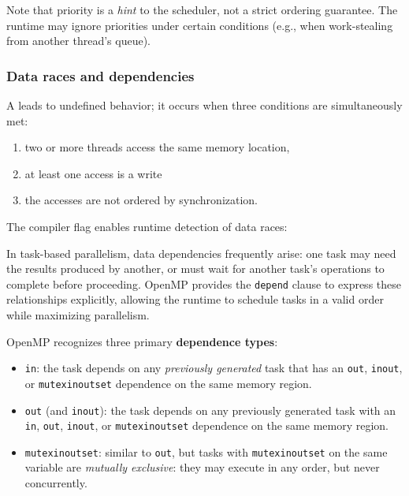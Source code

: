 Note that priority is a \emph{hint} to the scheduler, not a strict ordering guarantee. The runtime may ignore priorities under certain conditions (e.g., when work-stealing from another thread's queue).

\subsubsection{Data races and dependencies}

A  leads to undefined behavior; it occurs when three conditions are simultaneously met: 

\begin{enumerate}[label=\roman*,align=Center, noitemsep]
\item two or more threads access the same memory location, 
\item at least one access is a write
\item the accesses are not ordered by synchronization.
\end{enumerate}

\begin{tipsblock}
The compiler flag  enables runtime detection of data races:

\begin{center}
\end{center}
\end{tipsblock}

In task-based parallelism, data dependencies frequently arise: one task may need the results produced by another, or must wait for another task's operations to complete before proceeding. OpenMP provides the \texttt{depend} clause to express these relationships explicitly, allowing the runtime to schedule tasks in a valid order while maximizing parallelism.

OpenMP recognizes three primary \textbf{dependence types}:

\begin{itemize}
    \item \texttt{in}: the task depends on any \emph{previously generated} task that has an \texttt{out}, \texttt{inout}, or \texttt{mutexinoutset} dependence on the same memory region.
    
    \item \texttt{out} (and \texttt{inout}): the task depends on any previously generated task with an \texttt{in}, \texttt{out}, \texttt{inout}, or \texttt{mutexinoutset} dependence on the same memory region.
    
    \item \texttt{mutexinoutset}: similar to \texttt{out}, but tasks with \texttt{mutexinoutset} on the same variable are \emph{mutually exclusive}: they may execute in any order, but never concurrently.
\end{itemize}

